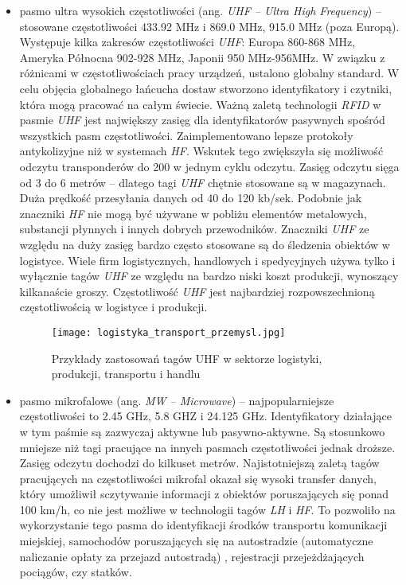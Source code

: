 \begin{itemize}
\begin{itemize}
\begin{itemize}
	\item pasmo ultra wysokich częstotliwości (ang. \emph{UHF – Ultra High Frequency}) – stosowane częstotliwości 433.92 MHz i 869.0 MHz, 915.0 MHz (poza Europą).
Występuje kilka zakresów częstotliwości \emph{UHF}: Europa 860-868 MHz, Ameryka Północna 902-928 MHz, Japonii  950 MHz-956MHz. W związku z różnicami w częstotliwościach pracy urządzeń, ustalono globalny standard.  W celu objęcia globalnego łańcucha dostaw stworzono identyfikatory i czytniki, która mogą pracować na całym świecie. Ważną zaletą technologii \emph{RFID} w pasmie \emph{UHF} jest największy zasięg dla identyfikatorów pasywnych spośród wszystkich pasm częstotliwości. Zaimplementowano lepsze protokoły antykolizyjne niż w systemach \emph{HF}. Wskutek tego zwiększyła się możliwość odczytu transponderów do 200 w jednym cyklu odczytu.  Zasięg odczytu sięga od 3 do 6 metrów – dlatego tagi \emph{UHF} chętnie stosowane są w magazynach.  Duża prędkość przesyłania danych od 40 do 120 kb/sek.  
Podobnie jak znaczniki \emph{HF} nie mogą być używane w pobliżu elementów metalowych, substancji płynnych i innych dobrych przewodników. 
Znaczniki \emph{UHF} ze względu na duży zasięg bardzo często stosowane są do śledzenia obiektów w logistyce. Wiele firm logistycznych, handlowych i spedycyjnych używa tylko i wyłącznie tagów \emph{UHF} ze względu na bardzo niski koszt produkcji, wynoszący kilkanaście groszy. 
Częstotliwość \emph{UHF} jest najbardziej rozpowszechnioną częstotliwością w logistyce i produkcji.

	\begin{figure}[h!]
	\centering
	    \texttt{[image: logistyka\_transport\_przemysl.jpg]}
	    \caption{Przykłady zastosowań tagów UHF w sektorze logistyki, produkcji, transportu i handlu}
	\end{figure}

	\item pasmo mikrofalowe (ang. \emph{MW – Microwave}) – najpopularniejsze częstotliwości to 2.45 GHz, 5.8 GHZ i 24.125 GHz.  
Identyfikatory działające w tym paśmie są zazwyczaj aktywne lub pasywno-aktywne. Są stosunkowo mniejsze niż tagi pracujące na innych pasmach częstotliwości jednak droższe. Zasięg odczytu dochodzi do kilkuset metrów. Najistotniejszą zaletą tagów pracujących na częstotliwości mikrofal okazał się wysoki transfer danych, który  umożliwił sczytywanie informacji z obiektów poruszających się ponad 100 km/h, co nie jest możliwe w technologii tagów \emph{LH} i \emph{HF}.  To pozwoliło na wykorzystanie tego pasma do identyfikacji środków transportu komunikacji miejskiej, samochodów poruszających się  na autostradzie (automatyczne naliczanie opłaty za przejazd autostradą) , rejestracji przejeżdżających pociągów, czy statków.


\end{itemize}
\end{itemize}
\end{itemize}
